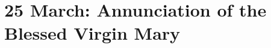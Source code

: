 {
\def\vrlinebreak{F}
\section{25 March: Annunciation of the Blessed Virgin Mary}
\subtitle{ Class}
\subtitle{I \& II Vespers}
\medskip

\def\deusinadjutoriumsolemn{T}
\def\definevesperspropers{
  \def\prepsalmfive{\greseteolcustos{manual}}
}
\def\definevesperspropersalt{}
\def\vesperspropersnote{At II Vespers:}
\def\vesperspropersaltnote{At I Vespers:}
\def\prepsalmtitletwo{\vspace{-0.5\baselineskip}}
\def\premagverses{\greseteolcustos{manual}}
\def\printhymnnote{
  {
    \oldneedspace{3\baselineskip}
    \printnote{Hymn.~\emph{Ave Maris Stella}, p.~\pageref{hymn-avemarisstella}.\\}

    \printnote{At II Vespers in Paschal time, add Alleluia to the versicle and response.\\}
  }
}
\def\begincollectcols{\begin{parcolumns}[rulebetween,colwidths={1=0.43\linewidth}]{2}}
\def\prevespers{
}
\def\vrlabel{vr-march25}

}

